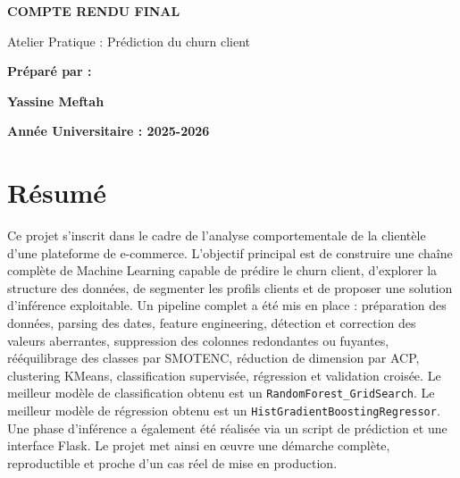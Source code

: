 \documentclass[11pt,a4paper]{article}
\begin{document}
\begin{titlepage}

\vspace{6cm}

\begin{center}
{\LARGE\textbf{COMPTE RENDU FINAL}}\par
\vspace{1cm}
{\large Atelier Pratique : Prédiction du churn client}\par
\vspace{2cm}
{\large \textbf{Préparé par :}}\par
\vspace{0.4cm}
{\Large \textbf{Yassine Meftah}}

\vspace{3cm}


\vspace{2cm}

{\textbf{Année Universitaire : 2025-2026}}
\end{center}
\vfill
\end{titlepage}

\section*{Résumé}
Ce projet s’inscrit dans le cadre de l’analyse comportementale de la clientèle d’une plateforme de e-commerce. L’objectif principal est de construire une chaîne complète de Machine Learning capable de prédire le churn client, d’explorer la structure des données, de segmenter les profils clients et de proposer une solution d’inférence exploitable. Un pipeline complet a été mis en place : préparation des données, parsing des dates, feature engineering, détection et correction des valeurs aberrantes, suppression des colonnes redondantes ou fuyantes, rééquilibrage des classes par SMOTENC, réduction de dimension par ACP, clustering KMeans, classification supervisée, régression et validation croisée. Le meilleur modèle de classification obtenu est un \texttt{RandomForest\_GridSearch}. Le meilleur modèle de régression obtenu est un \texttt{HistGradientBoostingRegressor}. Une phase d’inférence a également été réalisée via un script de prédiction et une interface Flask. Le projet met ainsi en œuvre une démarche complète, reproductible et proche d’un cas réel de mise en production.
\end{document}
